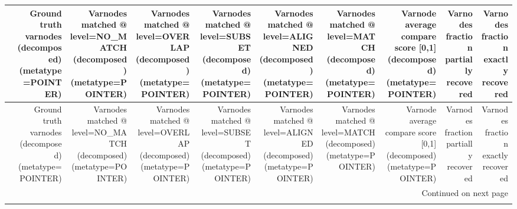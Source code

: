 \begin{longtable}{lrrrrrrrrr}
\toprule
{} &  Ground truth varnodes (decomposed) (metatype=POINTER) &  Varnodes matched @ level=NO\_MATCH (decomposed) (metatype=POINTER) &  Varnodes matched @ level=OVERLAP (decomposed) (metatype=POINTER) &  Varnodes matched @ level=SUBSET (decomposed) (metatype=POINTER) &  Varnodes matched @ level=ALIGNED (decomposed) (metatype=POINTER) &  Varnodes matched @ level=MATCH (decomposed) (metatype=POINTER) &  Varnode average compare score {[}0,1] (decomposed) (metatype=POINTER) &  Varnodes fraction partially recovered &  Varnodes fraction exactly recovered \\
\midrule
\endfirsthead

\toprule
{} &  Ground truth varnodes (decomposed) (metatype=POINTER) &  Varnodes matched @ level=NO\_MATCH (decomposed) (metatype=POINTER) &  Varnodes matched @ level=OVERLAP (decomposed) (metatype=POINTER) &  Varnodes matched @ level=SUBSET (decomposed) (metatype=POINTER) &  Varnodes matched @ level=ALIGNED (decomposed) (metatype=POINTER) &  Varnodes matched @ level=MATCH (decomposed) (metatype=POINTER) &  Varnode average compare score {[}0,1] (decomposed) (metatype=POINTER) &  Varnodes fraction partially recovered &  Varnodes fraction exactly recovered \\
\midrule
\endhead
\midrule
\multicolumn{10}{r}{{Continued on next page}} \\
\midrule
\endfoot


\end{longtable}
